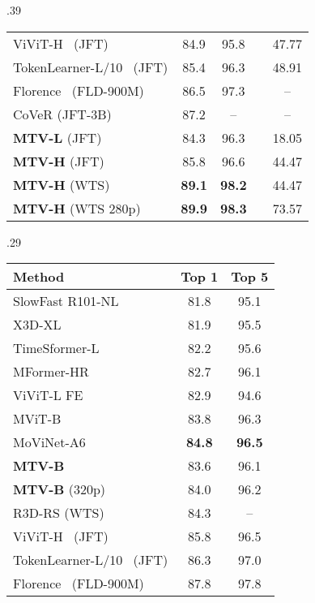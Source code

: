 \begin{table*}[t]
\begin{subtable}[t]{.39\linewidth}
{\begin{tabular}{lcccc}
				ViViT-H~\cite{arnab2021vivit} (JFT) 														&  84.9 &  95.8 	&  & 47.77 \\  TokenLearner-L/10~\cite{ryoo2021tokenlearner} (JFT) 														&  85.4 &  96.3 	&  & 48.91 \\  Florence~\cite{yuan2021florence} (FLD-900M) & 86.5 & 97.3 &  & -- \\
				CoVeR (JFT-3B)~\cite{zhang2021co} & 87.2 & -- &  & -- \\
				\textbf{MTV-L} (JFT) 														&  84.3 &  96.3 	&  & 18.05 \\  \textbf{MTV-H} (JFT) 														&  85.8 &  96.6 	&  & 44.47 \\ \textbf{MTV-H} (WTS) 														&  \textbf{89.1} &  \textbf{98.2} 	&  & 44.47 \\ \textbf{MTV-H} (WTS 280p) 														&  \textbf{89.9} &  \textbf{98.3} 	&  & 73.57 \\ \bottomrule
			\end{tabular}
		}
		\label{tab:sota_kinetics400}
	\end{subtable}
  	\hfill
  	\begin{subtable}[t]{.29\linewidth}
		\centering
  		\caption{Kinetics 600}
  		\setlength{\tabcolsep}{4pt} \vspace{-0.3\baselineskip}
  		\scriptsize{
	  		\begin{tabular}{lcc}
	  			\toprule
	  			Method 																			 & Top 1                & Top 5      \\ \midrule
SlowFast R101-NL~\cite{feichtenhofer_iccv_2019}       		&  81.8                     &  95.1   \\ X3D-XL~\cite{feichtenhofer_cvpr_2020}      						 &  81.9					&  95.5		\\ TimeSformer-L~\cite{bertasius_arxiv_2021}				  & 82.2				& 95.6		\\ MFormer-HR~\cite{patrick2021keeping} & 82.7 & 96.1  \\
	  			ViViT-L FE~\cite{arnab2021vivit} & 82.9 	&  94.6 \\  MViT-B~\cite{fan2021multiscale}					  & 83.8				& 96.3		\\ MoViNet-A6~\cite{kondratyuk2021movinets} & \textbf{84.8} 	&  \textbf{96.5} \\
	  			\textbf{MTV-B} & 83.6  & 96.1 \\ \textbf{MTV-B} (320p) & 84.0  & 96.2 \\ \midrule
  				R3D-RS (WTS)~\cite{du2021revisiting} & 84.3 & --  \\
	  			ViViT-H~\cite{arnab2021vivit} (JFT) & 85.8 & 96.5 \\ TokenLearner-L/10~\cite{ryoo2021tokenlearner} (JFT) &  86.3 &  97.0 \\  Florence~\cite{yuan2021florence} (FLD-900M) & 87.8 & 97.8 \\

\end{tabular}}
\end{subtable}
\end{table*}
